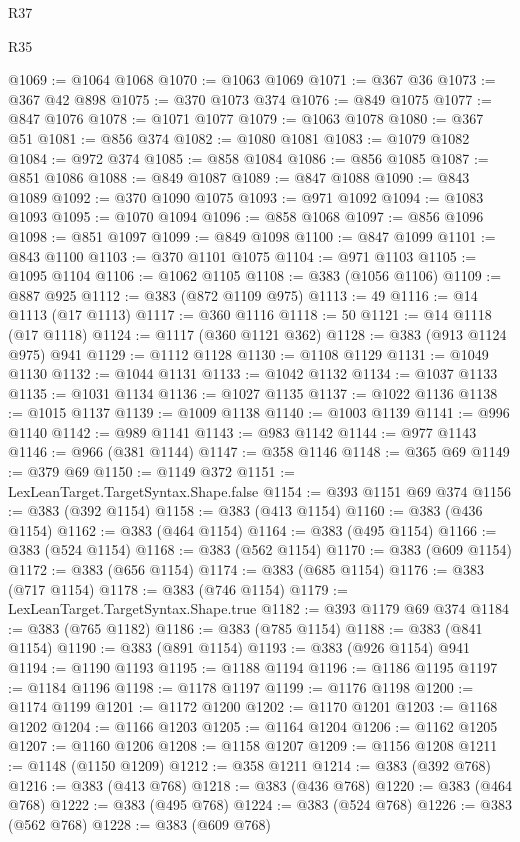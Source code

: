 \begin{lexlean}{R37}
\begin{lexlean}{R35}
\begin{coremodule}
{{{{{{{{{{{{{{{{{{{{{{{{{{{{{{{{{{{{{{{{{{{{{{{{{{{{@1069 := @1064 @1068
@1070 := @1063 @1069
@1071 := @367 @36
@1073 := @367 @42 @898
@1075 := @370 @1073 @374
@1076 := @849 @1075
@1077 := @847 @1076
@1078 := @1071 @1077
@1079 := @1063 @1078
@1080 := @367 @51
@1081 := @856 @374
@1082 := @1080 @1081
@1083 := @1079 @1082
@1084 := @972 @374
@1085 := @858 @1084
@1086 := @856 @1085
@1087 := @851 @1086
@1088 := @849 @1087
@1089 := @847 @1088
@1090 := @843 @1089
@1092 := @370 @1090 @1075
@1093 := @971 @1092
@1094 := @1083 @1093
@1095 := @1070 @1094
@1096 := @858 @1068
@1097 := @856 @1096
@1098 := @851 @1097
@1099 := @849 @1098
@1100 := @847 @1099
@1101 := @843 @1100
@1103 := @370 @1101 @1075
@1104 := @971 @1103
@1105 := @1095 @1104
@1106 := @1062 @1105
@1108 := @383 (@1056 @1106)
@1109 := @887 @925
@1112 := @383 (@872 @1109 @975)
@1113 := 49
@1116 := @14 @1113 (@17 @1113)
@1117 := @360 @1116
@1118 := 50
@1121 := @14 @1118 (@17 @1118)
@1124 := @1117 (@360 @1121 @362)
@1128 := @383 (@913 @1124 @975) @941
@1129 := @1112 @1128
@1130 := @1108 @1129
@1131 := @1049 @1130
@1132 := @1044 @1131
@1133 := @1042 @1132
@1134 := @1037 @1133
@1135 := @1031 @1134
@1136 := @1027 @1135
@1137 := @1022 @1136
@1138 := @1015 @1137
@1139 := @1009 @1138
@1140 := @1003 @1139
@1141 := @996 @1140
@1142 := @989 @1141
@1143 := @983 @1142
@1144 := @977 @1143
@1146 := @966 (@381 @1144)
@1147 := @358 @1146
@1148 := @365 @69
@1149 := @379 @69
@1150 := @1149 @372
@1151 := LexLeanTarget.TargetSyntax.Shape.false
@1154 := @393 @1151 @69 @374
@1156 := @383 (@392 @1154)
@1158 := @383 (@413 @1154)
@1160 := @383 (@436 @1154)
@1162 := @383 (@464 @1154)
@1164 := @383 (@495 @1154)
@1166 := @383 (@524 @1154)
@1168 := @383 (@562 @1154)
@1170 := @383 (@609 @1154)
@1172 := @383 (@656 @1154)
@1174 := @383 (@685 @1154)
@1176 := @383 (@717 @1154)
@1178 := @383 (@746 @1154)
@1179 := LexLeanTarget.TargetSyntax.Shape.true
@1182 := @393 @1179 @69 @374
@1184 := @383 (@765 @1182)
@1186 := @383 (@785 @1154)
@1188 := @383 (@841 @1154)
@1190 := @383 (@891 @1154)
@1193 := @383 (@926 @1154) @941
@1194 := @1190 @1193
@1195 := @1188 @1194
@1196 := @1186 @1195
@1197 := @1184 @1196
@1198 := @1178 @1197
@1199 := @1176 @1198
@1200 := @1174 @1199
@1201 := @1172 @1200
@1202 := @1170 @1201
@1203 := @1168 @1202
@1204 := @1166 @1203
@1205 := @1164 @1204
@1206 := @1162 @1205
@1207 := @1160 @1206
@1208 := @1158 @1207
@1209 := @1156 @1208
@1211 := @1148 (@1150 @1209)
@1212 := @358 @1211
@1214 := @383 (@392 @768)
@1216 := @383 (@413 @768)
@1218 := @383 (@436 @768)
@1220 := @383 (@464 @768)
@1222 := @383 (@495 @768)
@1224 := @383 (@524 @768)
@1226 := @383 (@562 @768)
@1228 := @383 (@609 @768)
}}}}}}}}}}}}}}}}}}}}}}}}}}}}}}}}}}}}}}}}}}}}}}}}}}}}
\end{coremodule}
\end{lexlean}
\end{lexlean}
